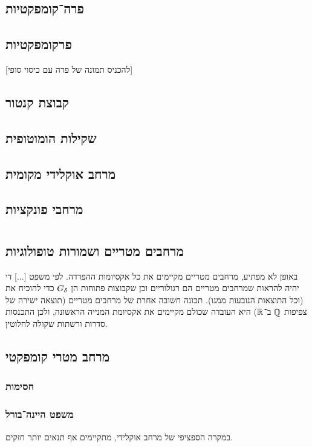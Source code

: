 \documentclass[name=רשימות טופולוגיה כללית]{../../../tex/classes/noChapterMegasumPreamble}
\begin{document}
	\subsection{פרה־קומפקטיות}
	\subsection{פרקומפקטיות}
	[להכניס תמונה של פרה עם כיסוי סופי]
	\subsection{קבוצת קנטור}
	\subsection{שקילות הומוטופית}
	\subsection{מרחב אוקלידי מקומית}
	\subsection{מרחבי פונקציות}
	
	
	\npage
	\section[מרחבים מטריים מנקודת מבט טופולוגית]{}
	\subsection{מרחבים מטריים ושמורות טופולוגיות}
	באופן לא מפתיע, מרחבים מטריים מקיימים את כל אקסיומות ההפרדה. לפי משפט [...]  די יהיה להראות שמרחבים מטריים הם רגולוריים וכן שקבוצות פתוחות הן $G_\delta$ כדי להוכיח את \Ty \ (וכל התוצאות הנובעות ממנו). תכונה חשובה אחרת של מרחבים מטריים (תוצאה ישירה של צפיפות $\mathbb{Q}$ ב־$\mathbb{R}$) היא העובדה שכולם מקיימים את אקסיומת המנייה הראשונה, ולכן התכנסות סדרות ורשתות שקולה לחלוטין. 
	\subsection{מרחב מטרי קומפקטי}
	\subsubsection{חסימות}
	\subsubsection{משפט היינה־בורל}
	במקרה הספציפי של מרחב אוקלידי, מתקיימים אף תנאים יותר חזקים. 
\end{document}
